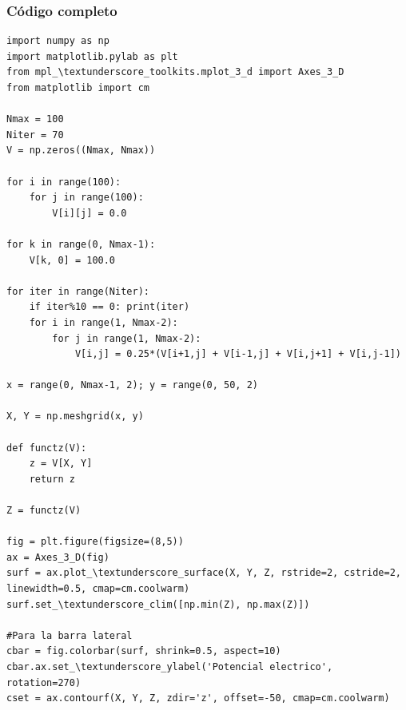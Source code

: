 {
\begin{frame}
\frametitle{Código completo}
\begin{lstlisting}[caption=Código que resuelve la ec. de Laplace en una malla cuadrada, style=FormattedNumber, basicstyle=\linespread{1.1}\ttfamily=\small, columns=fullflexible]
import numpy as np
import matplotlib.pylab as plt
from mpl_\textunderscore_toolkits.mplot_3_d import Axes_3_D
from matplotlib import cm

Nmax = 100
Niter = 70
V = np.zeros((Nmax, Nmax))

for i in range(100):
    for j in range(100):
        V[i][j] = 0.0
        
for k in range(0, Nmax-1):
    V[k, 0] = 100.0

for iter in range(Niter):
    if iter%10 == 0: print(iter)
    for i in range(1, Nmax-2):
        for j in range(1, Nmax-2):
            V[i,j] = 0.25*(V[i+1,j] + V[i-1,j] + V[i,j+1] + V[i,j-1])

x = range(0, Nmax-1, 2); y = range(0, 50, 2)

X, Y = np.meshgrid(x, y)

def functz(V):
    z = V[X, Y]
    return z

Z = functz(V)

fig = plt.figure(figsize=(8,5))
ax = Axes_3_D(fig)
surf = ax.plot_\textunderscore_surface(X, Y, Z, rstride=2, cstride=2, linewidth=0.5, cmap=cm.coolwarm)
surf.set_\textunderscore_clim([np.min(Z), np.max(Z)])

#Para la barra lateral
cbar = fig.colorbar(surf, shrink=0.5, aspect=10)
cbar.ax.set_\textunderscore_ylabel('Potencial electrico', rotation=270)
cset = ax.contourf(X, Y, Z, zdir='z', offset=-50, cmap=cm.coolwarm)


\end{lstlisting}
\end{frame}}
